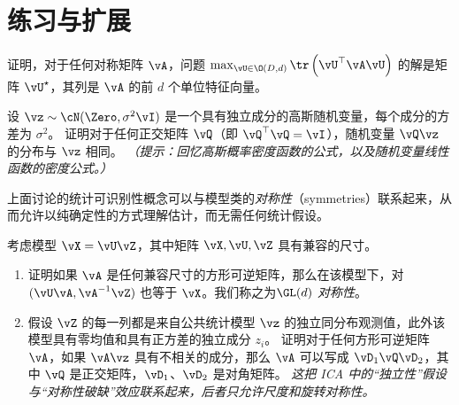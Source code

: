 \documentclass[../../book-main_zh.tex]{subfiles}
\begin{document}
\section{练习与扩展}

\begin{exercise}\label{exercise:principal-components-derivation}
    证明，对于任何对称矩阵 \(\vA\)，问题 \(\max_{\vU \in \O(D,
    d)}\tr\left(\vU^{\top}\vA\vU\right)\) 的解是矩阵 \(\vU^{\star}\)，其列是
    \(\vA\) 的前 \(d\) 个单位特征向量。
\end{exercise}

\begin{exercise}\label{exercise:gaussian-rot-invar}
    设 $\vz \sim \cN(\Zero, \sigma^2 \vI)$ 是一个具有独立成分的高斯随机变量，每个成分的方差为 $\sigma^2$。
    证明对于任何正交矩阵 $\vQ$（即 $\vQ^\top \vQ =
    \vI$），随机变量 $\vQ \vz$ 的分布与 $\vz$ 相同。
    \textit{（提示：回忆高斯概率密度函数的公式，以及随机变量线性函数的密度公式。） }
\end{exercise}

\begin{exercise}\label{exercise:symmetry-identifiability}
    上面讨论的统计可识别性概念可以与模型类的\textit{对称性}（symmetries）联系起来，从而允许以纯确定性的方式理解估计，而无需任何统计假设。

    考虑模型 $\vX = \vU \vZ$，其中矩阵 $\vX, \vU, \vZ$
    具有兼容的尺寸。
    \begin{enumerate}
        \item 证明如果 $\vA$ 是任何兼容尺寸的方形可逆矩阵，那么在该模型下，对
            $(\vU \vA, \vA^{-1} \vZ)$ 也等于 $\vX$。我们称之为\textit{$\GL(d)$ 对称性}。
        \item 假设 $\vZ$ 的每一列都是来自公共统计模型 $\vz$
            的独立同分布观测值，此外该模型具有零均值和具有正方差的独立成分 $z_i$。
            证明对于任何方形可逆矩阵 $\vA$，如果 $\vA
            \vz$ 具有不相关的成分，那么 $\vA$ 可以写成 $\vD_1 \vQ \vD_2$，其中 $\vQ$
            是正交矩阵，$\vD_1$、$\vD_2$ 是对角矩阵。
            \textit{这把 ICA 中的“独立性”假设与“对称性破缺”效应联系起来，后者只允许尺度和旋转对称性。}
    \end{enumerate}

\end{exercise}
\end{document}
